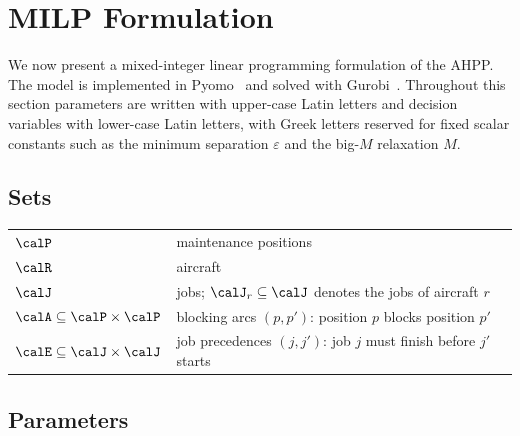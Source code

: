 \section{MILP Formulation}
\label{sec:milp}

We now present a mixed-integer linear programming formulation of the AHPP.
The model is implemented in Pyomo~\citep{Bynum2021} and solved with
Gurobi~\citep{Gurobi2023}.  Throughout this section parameters are written
with upper-case Latin letters and decision variables with lower-case Latin
letters, with Greek letters reserved for fixed scalar constants such as the
minimum separation $\varepsilon$ and the big-$M$ relaxation $M$.

\subsection*{Sets}

\begin{tabular}{@{}l@{\quad}p{}@{}}
  $\calP$
    & maintenance positions \\
  $\calR$
    & aircraft \\
  $\calJ$
    & jobs; $\calJ_r \subseteq \calJ$ denotes the jobs of aircraft $r$ \\
  $\calA \subseteq \calP \times \calP$
    & blocking arcs $(p, p')$: position $p$ blocks position $p'$ \\
  $\calE \subseteq \calJ \times \calJ$
    & job precedences $(j, j')$: job $j$ must finish before $j'$ starts \\
\end{tabular}

\subsection*{Parameters}


